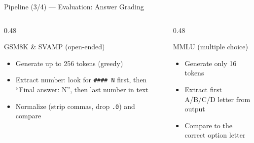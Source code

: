 \documentclass[aspectratio=169,10pt]{beamer}
\begin{document}
\begin{frame}{Pipeline (3/4) — Evaluation: Answer Grading}

  \begin{columns}[T]
    \begin{column}{0.48\textwidth}
      \begin{block}{GSM8K \& SVAMP (open-ended)}
        \begin{itemize}
          \item Generate up to 256 tokens (greedy)
          \item Extract number: look for \texttt{\#\#\#\# N} first,
                then ``Final answer: N'', then last number in text
          \item Normalize (strip commas, drop \texttt{.0}) and compare
        \end{itemize}
      \end{block}
    \end{column}

    \begin{column}{0.48\textwidth}
      \begin{block}{MMLU (multiple choice)}
        \begin{itemize}
          \item Generate only 16 tokens
          \item Extract first A/B/C/D letter from output
          \item Compare to the correct option letter
        \end{itemize}
      \end{block}
    \end{column}
  \end{columns}
\end{frame}
\end{document}
